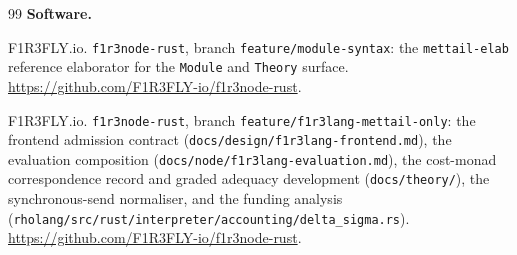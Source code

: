 \documentclass[11pt]{article}
\theoremstyle{definition}
\theoremstyle{plain}
\theoremstyle{remark}
\begin{document}
\begin{thebibliography}{99}
\bigskip
\noindent\textbf{Software.}

F1R3FLY.io.
\newblock \texttt{f1r3node-rust}, branch \texttt{feature/module-syntax}: the
\texttt{mettail-elab} reference elaborator for the \texttt{Module} and
\texttt{Theory} surface.
\newblock \url{https://github.com/F1R3FLY-io/f1r3node-rust}.

F1R3FLY.io.
\newblock \texttt{f1r3node-rust}, branch \texttt{feature/f1r3lang-mettail-only}:
the frontend admission contract (\texttt{docs/design/f1r3lang-frontend.md}),
the evaluation composition (\texttt{docs/node/f1r3lang-evaluation.md}), the
cost-monad correspondence record and graded adequacy development
(\texttt{docs/theory/}), the synchronous-send normaliser, and the funding
analysis (\texttt{rholang/src/rust/interpreter/accounting/delta\_sigma.rs}).
\newblock \url{https://github.com/F1R3FLY-io/f1r3node-rust}.

\end{thebibliography}
\end{document}
